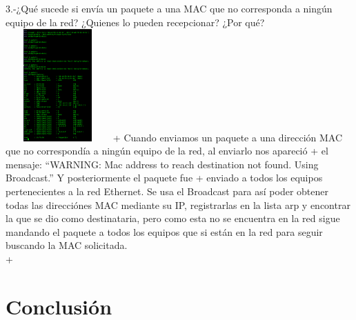 \documentclass{udpreport}
\begin{document}
  	  3.-¿Qué sucede si envía un paquete a una MAC que no corresponda a ningún equipo
  	      de la red? ¿Quienes lo pueden recepcionar? ¿Por qué?\\
    			\includegraphics[width=4cm, height=4.3cm]{EnvioPaquetitoMalo.png}
 +	      Cuando enviamos un paquete a una dirección MAC que no correspondía a ningún equipo de la red, al enviarlo nos apareció
 +	      el mensaje: “WARNING: Mac address to reach destination not found. Using Broadcast.” Y posteriormente el paquete fue
 +	      enviado a todos los equipos pertenecientes a la red Ethernet. Se usa el Broadcast para así poder obtener todas las
 	      direcciónes MAC mediante su IP, registrarlas en la lista arp y encontrar la que se dio como destinataria, pero como esta
 	      no se encuentra en la red sigue mandando el paquete a todos los equipos que si están en la red para seguir buscando la
 	      MAC solicitada.\\

 +	     
	      

\chapter{Conclusión}
  
\begin{thebibliography}{x}

\end{thebibliography}
\end{document}
